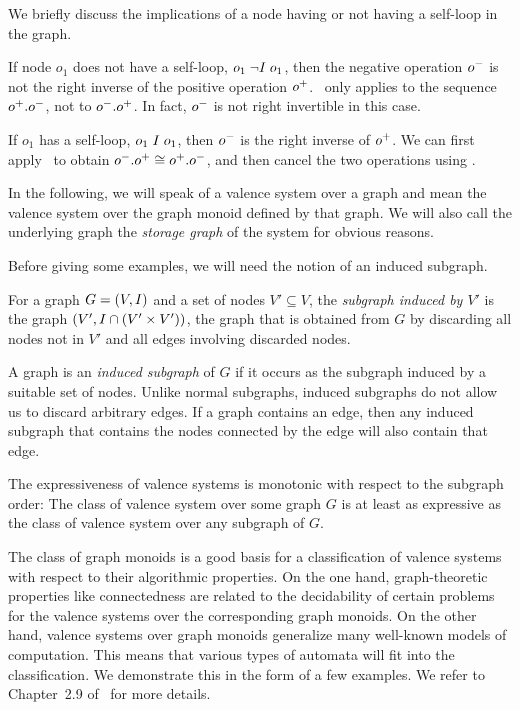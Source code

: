 \documentclass[../../diss.tex]{subfiles}
\begin{document}
%
\cheatpagebreak
%

\begin{remark}%
\label{Remark:ValenceSelfLoops}%
    We briefly discuss the implications of a node having or not having a self-loop in the graph.

    If node $o_1$ does not have a self-loop, $o_1 \mathrel{\neg I} o_1$, then the negative operation ${o}^-$ is not the right inverse of the positive operation ${o}^+$.
    \RuleCancel~only applies to the sequence ${o}^+.{o}^-$, not to ${o}^-.{o}^+$.
    In fact, ${o}^-$ is not right invertible in this case.

    If $o_1$ has a self-loop, $o_1 \mathrel{I} o_1$, then ${o}^-$ is the right inverse of ${o}^+$.
    We can first apply \RuleSwap~to obtain ${o}^-.{o}^+ \cong {o}^+.{o}^-$, and then cancel the two operations using \RuleCancel.
\end{remark}

In the following, we will speak of a valence system over a graph and mean the valence system over the graph monoid defined by that graph.
We will also call the underlying graph the \emph{storage graph} of the system for obvious reasons.

Before giving some examples, we will need the notion of an induced subgraph.

\begin{definition}
    For a graph $G = (V,I)$ and a set of nodes $V' \subseteq V$, the \emph{subgraph induced by $V'$} is the graph $(V', I \cap (V' \times V'))$, \ie the graph that is obtained from $G$ by discarding all nodes not in $V'$ and all edges involving discarded nodes.
\end{definition}

A graph is an \emph{induced subgraph} of $G$ if it occurs as the subgraph induced by a suitable set of nodes.
Unlike normal subgraphs, induced subgraphs do not allow us to discard arbitrary edges.
If a graph contains an edge, then any induced subgraph that contains the nodes connected by the edge will also contain that edge.

The expressiveness of valence systems is monotonic with respect to the subgraph order:
The class of valence system over some graph $G$ is at least as expressive as the class of valence system over any subgraph of $G$.

The class of graph monoids is a good basis for a classification of valence systems with respect to their algorithmic properties.
On the one hand, graph-theoretic properties like connectedness are related to the decidability of certain problems for the valence systems over the corresponding graph monoids.
On the other hand, valence systems over graph monoids generalize many well-known models of computation.
This means that various types of automata will fit into the classification.
We demonstrate this in the form of a few examples.
We refer to Chapter~2.9 of~\cite{Zetzsche15d} for more details.
\end{document}
